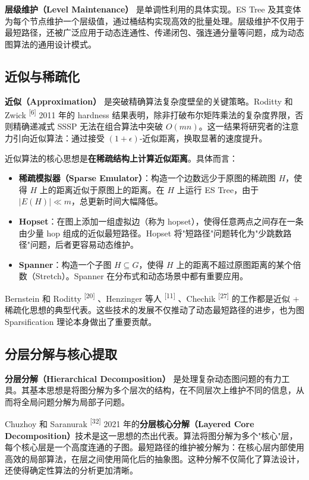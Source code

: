 \documentclass[12pt,a4paper]{ctexart}
\begin{document}
\textbf{层级维护（Level Maintenance）} 是单调性利用的具体实现。ES Tree 及其变体为每个节点维护一个层级值，通过桶结构实现高效的批量处理。层级维护不仅用于最短路径，还被广泛应用于动态连通性、传递闭包、强连通分量等问题，成为动态图算法的通用设计模式。

\subsection{近似与稀疏化}

\textbf{近似（Approximation）} 是突破精确算法复杂度壁垒的关键策略。Roditty 和 Zwick \textsuperscript{[6]}  2011 年的 hardness 结果表明，除非打破布尔矩阵乘法的复杂度界限，否则精确递减式 SSSP 无法在组合算法中突破 $O(mn)$。这一结果将研究者的注意力引向近似算法：通过接受 $(1+\epsilon)$-近似距离，换取显著的速度提升。

近似算法的核心思想是\textbf{在稀疏结构上计算近似距离}。具体而言：

\begin{itemize}
\item \textbf{稀疏模拟器（Sparse Emulator）}：构造一个边数远少于原图的稀疏图 $H$，使得 $H$ 上的距离近似于原图上的距离。在 $H$ 上运行 ES Tree，由于 $|E(H)|\ll m$，总更新时间大幅降低。
\item \textbf{Hopset}：在图上添加一组虚拟边（称为 hopset），使得任意两点之间存在一条由少量 hop 组成的近似最短路径。Hopset 将"短路径"问题转化为"少跳数路径"问题，后者更容易动态维护。
\item \textbf{Spanner}：构造一个子图 $H\subseteq G$，使得 $H$ 上的距离不超过原图距离的某个倍数（Stretch）。Spanner 在分布式和动态场景中都有重要应用。

\end{itemize}
Bernstein 和 Roditty \textsuperscript{[20]} 、Henzinger 等人 \textsuperscript{[11]} 、Chechik \textsuperscript{[27]}  的工作都是近似 + 稀疏化思想的典型代表。这些技术的发展不仅推动了动态最短路径的进步，也为图 Sparsification 理论本身做出了重要贡献。

\subsection{分层分解与核心提取}

\textbf{分层分解（Hierarchical Decomposition）} 是处理复杂动态图问题的有力工具。其基本思想是将图分解为多个层次的结构，在不同层次上维护不同的信息，从而将全局问题分解为局部子问题。

Chuzhoy 和 Saranurak \textsuperscript{[32]}  2021 年的\textbf{分层核心分解（Layered Core Decomposition）}技术是这一思想的杰出代表。算法将图分解为多个"核心"层，每个核心层是一个高度连通的子图。最短路径的维护被分解为：在核心层内部使用高效的局部算法，在层之间使用简化后的抽象图。这种分解不仅简化了算法设计，还使得确定性算法的分析更加清晰。
\end{document}
